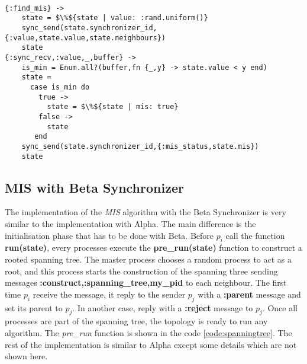 \begin{lstlisting}[frame=single, columns=fullflexible, mathescape=true, caption= Synchronous communication by \textit{MIS} algorithm, label = code:sync_call]

{:find_mis} -> 
    state = $\%${state | value: :rand.uniform()}
    sync_send(state.synchronizer_id,{:value,state.value,state.neighbours})
    state
{:sync_recv,:value,_,buffer} ->
    is_min = Enum.all?(buffer,fn {_,y} -> state.value < y end)
    state =
      case is_min do
        true ->
          state = $\%${state | mis: true}
        false ->
          state
       end
    sync_send(state.synchronizer_id,{:mis_status,state.mis})
    state

\end{lstlisting}

\subsection{MIS with Beta Synchronizer}

The implementation of the \textit{MIS} algorithm with the Beta Synchronizer is very similar to the implementation with Alpha. The main difference is the initialisation phase that has to be done with Beta. Before $p_i$ call the function \textbf{run(state)}, every processes execute the \textbf{pre\_run(state)} function to construct a rooted spanning tree. The master process chooses a random process to act as a root, and this process starts the construction of the spanning three sending messages \textbf{{:construct,:spanning\_tree,my\_pid}} to each neighbour. The first time $p_i$ receive the message, it reply to the sender $p_j$ with a \textbf{:parent} message and set its parent to $p_j$. In another case, reply with a \textbf{:reject} message to $p_j$. Once all processes are part of the spanning tree, the topology is ready to run any algorithm. The \textit{pre\_run} function is shown in the code \ref{code:spanningtree}. The rest of the implementation is similar to Alpha except some details which are not shown here.

